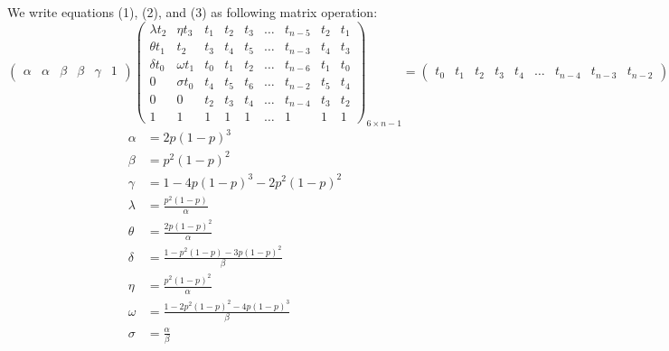 \documentclass[]{book}
\theoremstyle{definition}
\begin{document}
We write equations (1), (2), and (3) as following matrix operation:
\begin{equation}
\begin{pmatrix}
\alpha & \alpha & \beta & \beta & \gamma & 1
\end{pmatrix}
\begin{pmatrix}
\lambda t_2 & \eta   t_3 & t_1 & t_2 & t_3 & \ldots & t_{n-5} & t_2  & t_1 \\
 \theta t_1 &        t_2 & t_3 & t_4 & t_5 & \ldots & t_{n-3} & t_4  & t_3 \\
 \delta t_0 & \omega t_1 & t_0 & t_1 & t_2 & \ldots & t_{n-6} & t_1  & t_0 \\
          0 & \sigma t_0 & t_4 & t_5 & t_6 & \ldots & t_{n-2} & t_5  & t_4 \\
          0 &          0 & t_2 & t_3 & t_4 & \ldots & t_{n-4} & t_3  & t_2 \\
          1 &          1 &   1 &   1 &   1 & \ldots &       1 &   1  &   1
\end{pmatrix}_{6\times n-1}=
\begin{pmatrix}
t_0 & t_1 & t_2 & t_3 & t_4 & \ldots & t_{n-4} & t_{n-3} & t_{n-2}
\end{pmatrix}
\end{equation}
\begin{equation}
\begin{split}
    \alpha &= 2p(1-p)^3 \\
    \beta &= p^2(1-p)^2 \\
    \gamma &= 1 - 4p(1-p)^3 - 2p^2(1-p)^2 \\
    \lambda &= \frac{p^2(1-p)}{\alpha} \\
    \theta &= \frac{2p(1-p)^2}{\alpha} \\
    \delta &= \frac{1 -  p^2(1-p) - 3p(1-p)^2}{\beta} \\
    \eta &=  \frac{p^2(1-p)^2}{\alpha} \\
    \omega &= \frac{1 -  2p^2(1-p)^2 - 4p(1-p)^3}{\beta} \\
    \sigma &= \frac{\alpha}{\beta}
\end{split}
\end{equation}
\end{document}
